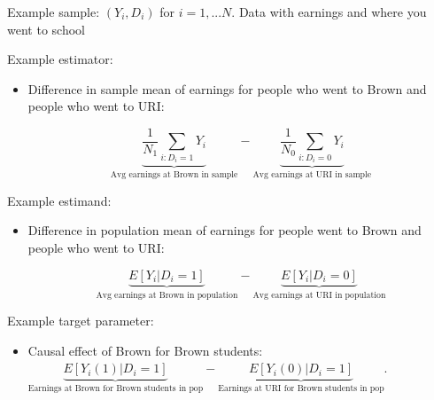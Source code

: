 \documentclass[11pt,english,handout]{beamer}
\newenvironment{wideitemizeshort}{\itemize}{\enditemize}
\begin{document}
\begin{frame}
\begin{wideitemizeshort}
	\item
	Example sample: $(Y_i,D_i)$ for $i=1,...N$. Data with earnings and where you went to school
	
	\pause 
	
	\item
	Example estimator: 
		\begin{itemize}
			\item
			Difference in sample mean of earnings for people who went to Brown and people who went to URI: 
			
			$$ \underbrace{\frac{1}{N_1} \sum_{i:D_i=1} Y_i}_{\text{Avg earnings at Brown in sample}} - \underbrace{\frac{1}{N_0} \sum_{i:D_i=0} Y_i}_{\text{Avg earnings at URI in sample}}$$		
		\end{itemize}
	
	\pause
		\item
		Example estimand: 	
		
				\begin{itemize}
			\item
			Difference in population mean of earnings for people went to Brown and people who went to URI: 
			
			$$\underbrace{ E[ Y_i | D_i = 1] }_{\text{Avg earnings at Brown in population}} - \underbrace{E[Y_i | D_i = 0]}_{\text{Avg earnings at URI in population}}$$
		 
		\end{itemize}
	\pause 
	
	\item
	Example target parameter:
		\begin{itemize}
			\item Causal effect of Brown for Brown students:
			$\underbrace{E[Y_i(1) | D_i =1]}_{\text{Earnings at Brown for Brown students in pop}} - \underbrace{E[Y_i(0) | D_i = 1]}_{\text{Earnings at URI for Brown students in pop}} $.   
		\end{itemize}
\end{wideitemizeshort}
\end{frame}
\end{document}
